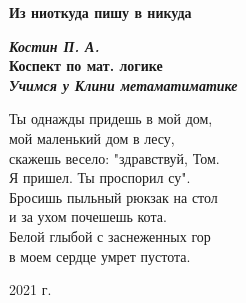 \documentclass[../main.tex]{subfiles}
\begin{document}
\begin{titlepage}
    \begin{center}
        \textbf{Из ниоткуда пишу в никуда}
        \vspace{35mm}

        \textbf{\textit{\large Костин П. А.}} \\[8mm]
        \textbf{\large Коспект по мат. логике}\\[3mm]
        \textbf{\textit{\large Учимся у Клини метаматиматике}}

        \vspace{20mm}

        Ты однажды придешь в мой дом,\\
        мой маленький дом в лесу,\\
        скажешь весело: "здравствуй, Том.\\
        Я пришел. Ты проспорил су".\\
        Бросишь пыльный рюкзак на стол\\
        и за ухом почешешь кота.\\
        Белой глыбой с заснеженных гор\\
        в моем сердце умрет пустота.

        \vspace*{\fill}


        \vspace*{\fill}

        \par{2021 г.}
    \end{center}
\end{titlepage}
\restoregeometry
\addtocounter{page}{1}
\end{document}
